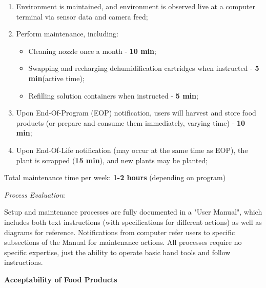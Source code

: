 \documentclass{report}
\begin{document}
\begin{enumerate}
    \item Environment is maintained, and environment is observed live at a computer terminal via sensor data and camera feed;
    \item Perform maintenance, including:
    \begin{itemize}
        \item Cleaning nozzle once a month - \textbf{10 min}\footnotemark[3];
        \item Swapping and recharging dehumidification cartridges when instructed - \textbf{5 min}\footnotemark[2] (active time);
        \item Refilling solution containers when instructed - \textbf{5 min}\footnotemark[2];
    \end{itemize}
    \item Upon End-Of-Program (EOP) notification, users will harvest and store food products (or prepare and consume them immediately, varying time) - \textbf{10 min}\footnotemark[1];
    \item Upon End-Of-Life notification (may occur at the same time as EOP), the plant is scrapped (\textbf{15 min}), and new plants may be planted;
\end{enumerate}

Total maintenance time per week: \textbf{1-2 hours} (depending on program)

\textit{Process Evaluation}:

Setup and maintenance processes are fully documented in a "User Manual", which includes both text instructions (with specifications for different actions) as well as diagrams for reference. Notifications from computer refer users to specific subsections of the Manual for maintenance actions. All processes require no specific expertise, just the ability to operate basic hand tools and follow instructions.

\textbf{Acceptability of Food Products}
\label{sec:acceptability-products}

\end{document}
